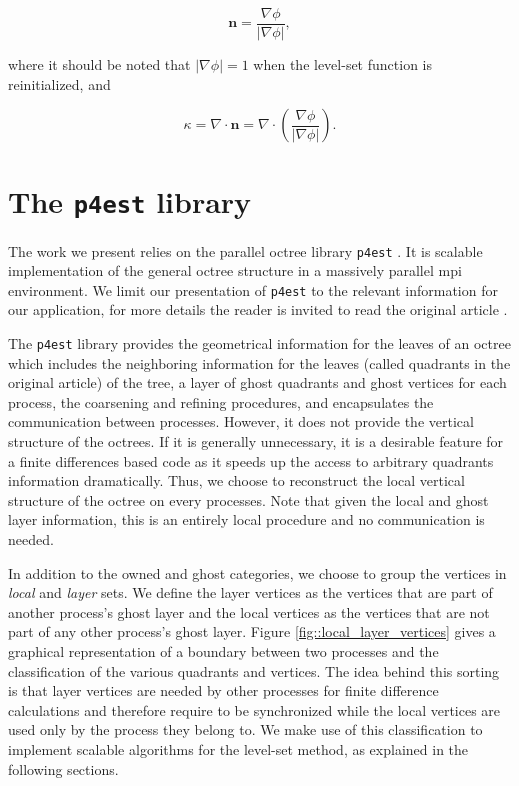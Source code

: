 \documentclass{elsarticle}
\begin{document}
\begin{equation*}
\mathbf{n} = \frac{\nabla \phi}{\lvert \nabla \phi \rvert},
\end{equation*}

where it should be noted that $\lvert \nabla \phi \rvert = 1$ when the level-set function is reinitialized, and

\begin{equation*}
\kappa = \nabla \cdot \mathbf{n} =  \nabla \cdot \left( \frac{\nabla \phi}{\lvert \nabla \phi \rvert} \right).
\end{equation*}


\section{The \texttt{p4est} library}

The work we present relies on the parallel octree library \texttt{p4est} \cite{Burstedde;Wilcox;Ghattas:11:p4est:-Scalable-Algo}. It is scalable implementation of the general octree structure in a massively parallel mpi environment. We limit our presentation of \texttt{p4est} to the relevant information for our application, for more details the reader is invited to read the original article \cite{Burstedde;Wilcox;Ghattas:11:p4est:-Scalable-Algo}.

The \texttt{p4est} library provides the geometrical information for the leaves of an octree which includes the neighboring information for the leaves (called quadrants in the original article) of the tree, a layer of ghost quadrants and ghost vertices for each process, the coarsening and refining procedures, and encapsulates the communication between processes. However, it does not provide the vertical structure of the octrees. If it is generally unnecessary, it is a desirable feature for a finite differences based code as it speeds up the access to arbitrary quadrants information dramatically. Thus, we choose to reconstruct the local vertical structure of the octree on every processes. Note that given the local and ghost layer information, this is an entirely local procedure and no communication is needed.

In addition to the owned and ghost categories, we choose to group the vertices in \textit{local} and \textit{layer} sets. We define the layer vertices as the vertices that are part of another process's ghost layer and the local vertices as the vertices that are not part of any other process's ghost layer. Figure \ref{fig::local_layer_vertices} gives a graphical representation of a boundary between two processes and the classification of the various quadrants and vertices. The idea behind this sorting is that layer vertices are needed by other processes for finite difference calculations and therefore require to be synchronized while the local vertices are used only by the process they belong to. We make use of this classification to implement scalable algorithms for the level-set method, as explained in the following sections.
\end{document}
